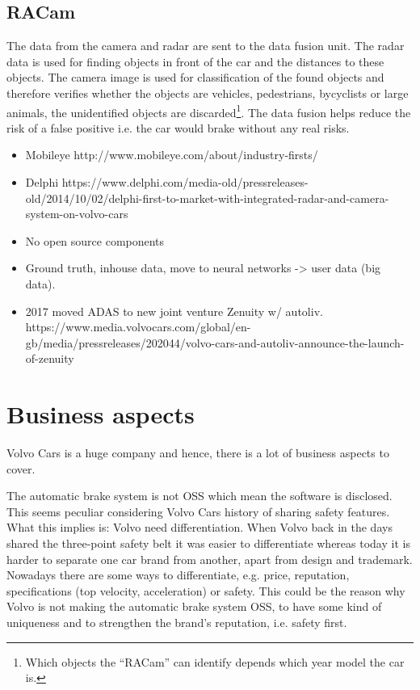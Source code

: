 \documentclass[conference]{IEEEtran}
\begin{document}
\subsection{RACam}
The data from the camera and radar are sent to the data fusion unit. The radar data is used for finding objects in front of the car and the distances to these objects. The camera image is used for classification of the found objects and therefore verifies whether the objects are vehicles, pedestrians, bycyclists or large animals, the unidentified objects are discarded\footnote{Which objects the ``RACam'' can identify depends which year model the car is.}. The data fusion helps reduce the risk of a false positive i.e. the car would brake without any real risks.\cite{SysDescription}
\begin{itemize}
	\item Mobileye http://www.mobileye.com/about/industry-firsts/
	\item Delphi https://www.delphi.com/media-old/pressreleases-old/2014/10/02/delphi-first-to-market-with-integrated-radar-and-camera-system-on-volvo-cars
	\item No open source components
	\item Ground truth, inhouse data, move to neural networks -> user data (big data).
	\item 2017 moved ADAS to new joint venture Zenuity w/ autoliv. https://www.media.volvocars.com/global/en-gb/media/pressreleases/202044/volvo-cars-and-autoliv-announce-the-launch-of-zenuity
\end{itemize}
\section{Business aspects}
Volvo Cars is a huge company and hence, there is a lot of business aspects to cover.

The automatic brake system is not OSS which mean the software is disclosed. This seems peculiar considering Volvo Cars history of sharing safety features. What this implies is: Volvo need differentiation. When Volvo back in the days shared the three-point safety belt it was easier to differentiate whereas today it is harder to separate one car brand from another, apart from design and trademark. Nowadays there are some ways to differentiate, e.g. price, reputation, specifications (top velocity, acceleration) or safety. This could be the reason why Volvo is not making the automatic brake system OSS, to have some kind of uniqueness and to strengthen the brand's reputation, i.e. safety first. \cite{VolvoVision}
\end{document}
